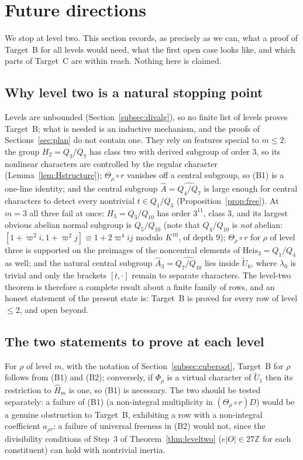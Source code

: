 \documentclass[11pt]{article}
\newcommand{\Z}{\mathbb Z}
\newcommand{\tU}{\widetilde U}
\theoremstyle{plain}
\theoremstyle{definition}
\begin{document}
\section{Future directions}\label{sec:future}
We stop at level two.  This section records, as precisely as we can,
what a proof of Target~B for all levels would need, what the first open
case looks like, and which parts of Target~C are within reach.  Nothing
here is claimed.

\subsection{Why level two is a natural stopping point}
Levels are unbounded (Section~\ref{subsec:divalg}), so no finite list of
levels proves Target~B; what is needed is an inductive mechanism, and the
proofs of Sections~\ref{sec:plan} do not contain one.  They rely on
features special to $m\le2$: the group $H_2=Q_3/Q_7$ has class two with
derived subgroup of order $3$, so its nonlinear characters are
controlled by the regular character (Lemma~\ref{lem:Hstructure});
$\Theta_\rho\circ r$ vanishes off a central subgroup, so (B1) is a
one-line identity; and the central subgroup $\hat A=\widehat{Q_4/Q_7}$
is large enough for central characters to detect every nontrivial
$t\in Q_1/Q_3$ (Proposition~\ref{prop:free}).  At $m=3$ all three fail
at once: $H_3=Q_3/Q_{10}$ has order $3^{11}$, class $3$, and its
largest obvious abelian normal subgroup is $Q_5/Q_{10}$ (note that
$Q_4/Q_{10}$ is \emph{not} abelian: $[1+\varpi^2i,1+\varpi^2j]\equiv1+2\varpi^4ij$
modulo $K^{10}$, of depth $9$); $\Theta_\rho\circ r$ for $\rho$ of level
three is supported on the preimages of the noncentral elements of
$\mathrm{Heis}_3=Q_1/Q_4$ as well; and the natural central subgroup
$\hat A_3=\widehat{Q_7/Q_{10}}$ lies inside $\tU_6$, where
$\lambda_0$ is trivial and only the brackets $[t,\cdot]$ remain to
separate characters.  The level-two theorem is therefore a complete
result about a finite family of rows, and an honest statement of the
present state is: Target~B is proved for every row of level $\le2$,
and open beyond.

\subsection{The two statements to prove at each level}
For $\rho$ of level $m$, with the notation of
Section~\ref{subsec:cuberoot}, Target~B for $\rho$ follows from (B1)
and (B2); conversely, if $\Phi_\rho$ is a virtual character of $\tU_1$
then its restriction to $\hat H_m$ is one, so (B1) is necessary.  The
two should be tested separately: a failure of (B1) (a non-integral
multiplicity in $(\Theta_\rho\circ r)D$) would be a genuine obstruction
to Target~B, exhibiting a row with a non-integral coefficient
$a_{\rho\tau}$; a failure of universal freeness in (B2) would not, since
the divisibility conditions of Step~3 of Theorem~\ref{thm:leveltwo}
($e|O|\in27\Z$ for each constituent) can hold with nontrivial inertia.
\end{document}
